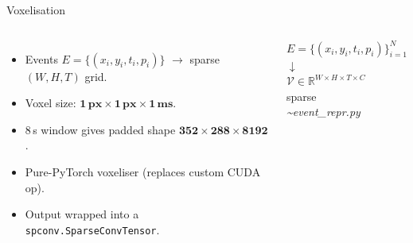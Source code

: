 \documentclass[aspectratio=169,11pt]{beamer}
\newcommand{\srctag}[1]{{\footnotesize\itshape\color{mutedgray}\textasciitilde#1}}
\begin{document}
\begin{frame}{Voxelisation}
  \vspace{0.2em}
  \begin{columns}[T,onlytextwidth]
    \begin{itemize}
      \setlength\itemsep{0.4em}
      \item Events
            $E = \{(x_i, y_i, t_i, p_i)\}$
            $\to$ sparse $(W,H,T)$ grid.
      \item Voxel size:
            $\mathbf{1\,\text{px} \times 1\,\text{px} \times 1\,\text{ms}}$.
      \item 8\,s window gives padded shape
            $\mathbf{352 \times 288 \times 8192}$.
      \item Pure-PyTorch voxeliser (replaces custom CUDA op).
      \item Output wrapped into a \texttt{spconv.SparseConvTensor}.
    \end{itemize}

    \begin{darkbox}
      \centering
      $E = \{(x_i, y_i, t_i, p_i)\}_{i=1}^{N}$\\[0.5em]
      $\downarrow$\\[0.5em]
      $\mathcal{V} \in \mathbb{R}^{W \times H \times T \times C}$\\
      sparse\\[0.4em]
      \srctag{event\_repr.py}
    \end{darkbox}
  \end{columns}
\end{frame}
\end{document}
